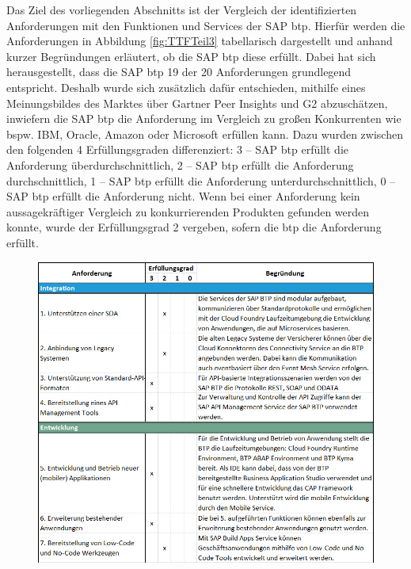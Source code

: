 Das Ziel des vorliegenden Abschnitts ist der Vergleich der identifizierten Anforderungen mit den Funktionen und Services der SAP \ac{btp}. Hierfür werden die Anforderungen in Abbildung \ref{fig:TTFTeil3} tabellarisch dargestellt und anhand kurzer Begründungen erläutert, ob die SAP \ac{btp} diese erfüllt. Dabei hat sich herausgestellt, dass die SAP \ac{btp} 19 der 20 Anforderungen grundlegend entspricht. Deshalb wurde sich zusätzlich dafür entschieden, mithilfe eines Meinungsbildes des Marktes über Gartner Peer Insights und G2 abzuschätzen, inwiefern die SAP \ac{btp} die Anforderung im Vergleich zu großen Konkurrenten wie bspw. IBM, Oracle, Amazon oder Microsoft erfüllen kann. Dazu wurden zwischen den folgenden 4 Erfüllungsgraden differenziert: 3 – SAP \ac{btp} erfüllt die Anforderung überdurchschnittlich, 2 – SAP \ac{btp} erfüllt die Anforderung durchschnittlich, 1 – SAP \ac{btp} erfüllt die Anforderung unterdurchschnittlich, 0 – SAP \ac{btp} erfüllt die Anforderung nicht. Wenn bei einer Anforderung kein aussagekräftiger Vergleich zu konkurrierenden Produkten gefunden werden konnte, wurde der Erfüllungsgrad 2 vergeben, sofern die \ac{btp} die Anforderung erfüllt. 

\begin{figure}[ht]
    \centering
    \includegraphics[width=1\textwidth]{img/TTFTeil1E2.jpg}
    \label{fig:TTFTeil1}
\end{figure}

